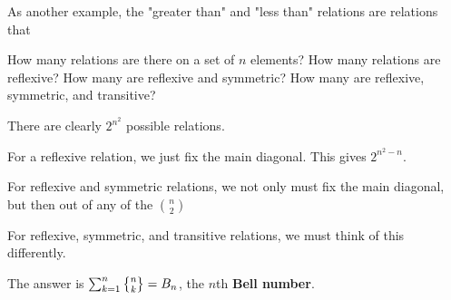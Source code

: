 \documentclass[11pt,twosided]{article}
\begin{document}
As another example, the "greater than" and "less than" relations are relations that 

\begin{problem}
How many relations are there on a set of $n$ elements? How many relations are reflexive? How many are reflexive and symmetric? How many are reflexive, symmetric, and transitive? 
\end{problem}

\begin{solution}
	There are clearly $2^{n^2}$ possible relations. 
	
	For a reflexive relation, we just fix the main diagonal. This gives $2^{n^2-n}$. 
	
	For reflexive and symmetric relations, we not only must fix the main diagonal, but then out of any of the $\binom{n}{2}$ 
	
	For reflexive, symmetric, and transitive relations, we must think of this differently. 
	
	The answer is $\sum_{k=1}^n \stirii{n}{k} = B_n$, the $n$th \textbf{Bell  number}. 
\end{solution}
\end{document}
